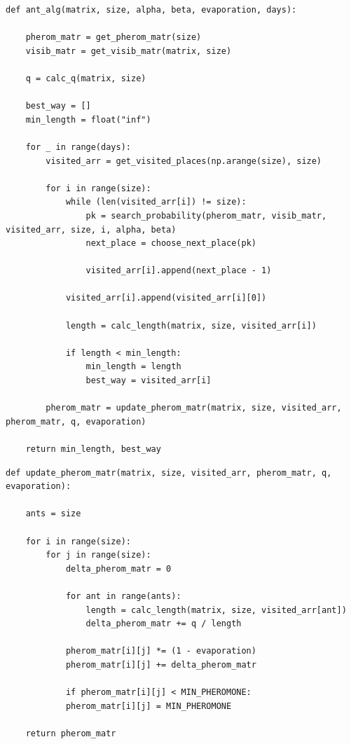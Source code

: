 \documentclass[a4paper,14pt, unknownkeysallowed]{extreport}
\begin{document}
\begin{center}
\captionsetup{justification=raggedright,singlelinecheck=off}
\begin{lstlisting}[label=lst:ant_alg,caption=Муравьиный алгоритм]
def ant_alg(matrix, size, alpha, beta, evaporation, days):

	pherom_matr = get_pherom_matr(size)
	visib_matr = get_visib_matr(matrix, size)

	q = calc_q(matrix, size)

	best_way = []
	min_length = float("inf")

	for _ in range(days):
		visited_arr = get_visited_places(np.arange(size), size)

		for i in range(size):
			while (len(visited_arr[i]) != size):
				pk = search_probability(pherom_matr, visib_matr, visited_arr, size, i, alpha, beta)  
				next_place = choose_next_place(pk)

				visited_arr[i].append(next_place - 1)

			visited_arr[i].append(visited_arr[i][0])
			
			length = calc_length(matrix, size, visited_arr[i]) 

			if length < min_length:
				min_length = length
				best_way = visited_arr[i]

		pherom_matr = update_pherom_matr(matrix, size, visited_arr, pherom_matr, q, evaporation)

	return min_length, best_way
\end{lstlisting}
\end{center}

\clearpage

\begin{center}
\captionsetup{justification=raggedright,singlelinecheck=off}
\begin{lstlisting}[label=lst:update_pherom_matr,caption=Функция для обновления феромонов]
def update_pherom_matr(matrix, size, visited_arr, pherom_matr, q, evaporation):

	ants = size

	for i in range(size):
		for j in range(size):
			delta_pherom_matr = 0

			for ant in range(ants):
				length = calc_length(matrix, size, visited_arr[ant])
				delta_pherom_matr += q / length

			pherom_matr[i][j] *= (1 - evaporation)
			pherom_matr[i][j] += delta_pherom_matr

			if pherom_matr[i][j] < MIN_PHEROMONE:
			pherom_matr[i][j] = MIN_PHEROMONE

	return pherom_matr
\end{lstlisting}
\end{center}	
\end{document}

